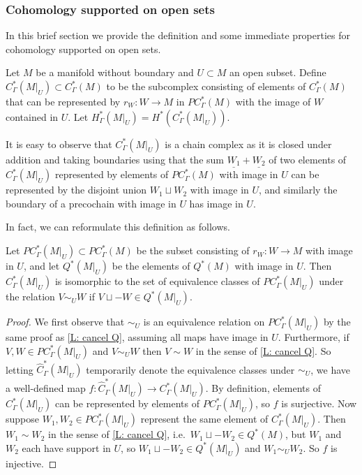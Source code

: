 \subsubsection{Cohomology supported on open sets}

In this brief section we provide the definition and some immediate properties for cohomology supported on open sets.

\begin{definition}
	Let $M$ be a manifold without boundary and $U \subset M$ an open subset.
	Define $C_\Gamma^*(M|_U) \subset C_\Gamma^*(M)$ to be the subcomplex consisting of elements of $C_\Gamma^*(M)$ that can be represented by $r_W \colon W \to M$ in $PC^*_\Gamma(M)$ with the image of $W$ contained in $U$.
	Let $H_\Gamma^*(M|_U) = H^*(C_\Gamma^*(M|_U))$.
\end{definition}

It is easy to observe that $C_\Gamma^*(M|_U)$ is a chain complex as it is closed under addition and taking boundaries using that the sum $\underline{W_1}+\underline{W_2}$ of two elements of $C^*_\Gamma(M|_U)$ represented by elements of $PC^*_\Gamma(M)$ with image in $U$ can be represented by the disjoint union $W_1 \sqcup W_2$ with image in $U$, and similarly the boundary of a precochain with image in $U$ has image in $U$.

In fact, we can reformulate this definition as follows.

\begin{lemma}
	Let $PC_\Gamma^*(M|_U) \subset PC_\Gamma^*(M)$ be the subset consisting of $r_W \colon W \to M$ with image in $U$, and let $Q^*(M|_U)$ be the elements of $Q^*(M)$ with image in $U$.
	Then $C_\Gamma^*(M|_U)$ is isomorphic to the set of equivalence classes of $PC_\Gamma^*(M|_U)$ under the relation $V\sim_U W$ if $V \sqcup -W \in Q^*(M|_U)$.
\end{lemma}

\begin{proof}
	We first observe that $\sim_U$ is an equivalence relation on $PC_\Gamma^*(M|_U)$ by the same proof as \cref{L: cancel Q}, assuming all maps have image in $U$.
	Furthermore, if $V,W \in PC_\Gamma^*(M|_U)$ and $V\sim_UW$ then $V\sim W$ in the sense of \cref{L: cancel Q}.
	So letting $\hat C_\Gamma^*(M|_U)$ temporarily denote the
	equivalence classes under $\sim_U$, we have a well-defined map $f \colon \hat C_\Gamma^*(M|_U) \to C_\Gamma^*(M|_U)$.
	By definition, elements of $C_\Gamma^*(M|_U)$ can be represented by elements of $PC_\Gamma^*(M|_U)$, so $f$ is surjective.
	Now suppose $W_1,W_2 \in PC^*_\Gamma(M|_U)$ represent the same element of $C^*_\Gamma(M|_U)$.
	Then $W_1\sim W_2$ in the sense of \cref{L: cancel Q}, i.e.\ $W_1 \sqcup -W_2 \in Q^*(M)$, but $W_1$ and $W_2$ each have support in $U$, so $W_1 \sqcup -W_2 \in Q^*(M|_U)$ and $W_1\sim_U W_2$.
	So $f$ is injective.
\end{proof}


